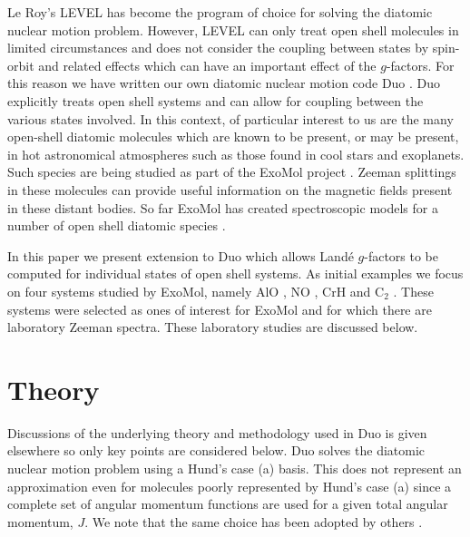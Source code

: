 \documentclass[preprint,review,12pt]{elsarticle}
\newcommand{\2}{$_{2}$}
\newcommand{\3}{$_{3}$}
\newcommand{\4}{$_{4}$}
\newcommand{\8}{$^{18}$}
\newcommand{\6}{$^{16}$}
\newcommand{\7}{$^{17}$}
\begin{document}
Le Roy's {\sc LEVEL} \cite{level} has become the program of choice for
solving the diatomic nuclear motion problem. However, {\sc LEVEL} can
only treat open shell molecules in limited circumstances
\cite{15WaSeLe.NaH,jt605} and does not consider the coupling between
states by spin-orbit and related effects which can have an important
effect of the $g$-factors.  For this reason we have written our own
diatomic nuclear motion code {\sc Duo} \cite{jt609}. {\sc Duo}
explicitly treats open shell systems and can allow for coupling
between the various states involved.  In this context, of particular
interest to us are the many open-shell diatomic molecules which are
known to be present, or may be present, in hot astronomical atmospheres
such as those found in cool stars and exoplanets.
Such species are being studied  as part of the ExoMol
project \cite{jt528}. Zeeman splittings in these molecules can provide
useful information on the magnetic fields present in these distant
bodies. So far ExoMol has created spectroscopic models for a number of
open shell diatomic species \cite{jt605,jt598,jt599,jt618,jt644,jtCrH,jtTiH,jtPS,jtTiO}.

In this paper we present extension to  {\sc Duo} which allows
Land\'e $g$-factors to be computed for individual states of open shell
systems. As initial examples we focus on
four systems studied by ExoMol, namely
AlO  \cite{jt598}, NO \cite{jtNO}, CrH \cite{jtCrH} and C$_2$ \cite{jt637,jtexoC2}.
These systems were selected as ones of interest for ExoMol and
for which there are laboratory Zeeman spectra. These laboratory
studies are discussed below.


\section{Theory}

Discussions of the underlying theory and methodology used in {\sc Duo}
is given elsewhere \cite{jt609,jt589,jt632} so only key points are considered
below. {\sc Duo} solves the diatomic nuclear motion problem using
a Hund's case (a) basis. This does not represent
an approximation even for molecules poorly represented
by  Hund's case (a) since  a complete set of angular momentum functions
are used for a given total angular momentum, $J$. We note that the same
choice has been adopted by others \cite{95Marian.NiH,15Schwenke.diatom}.
	
\end{document}
